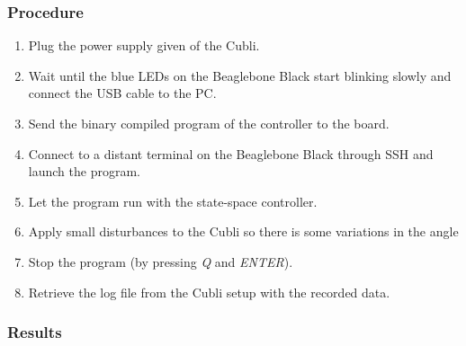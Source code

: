 \subsubsection{Procedure}
\begin{enumerate}
	  \item Plug the power supply given of the Cubli.
	  \item Wait until the blue LEDs on the Beaglebone Black start blinking slowly and connect the USB cable to the PC.
	  \item Send the binary compiled program of the controller to the board.
	  \item Connect to a distant terminal on the Beaglebone Black through SSH and launch the program.
	  \item Let the program run with the state-space controller.
	  \item Apply small disturbances to the Cubli so there is some variations in the angle
	  \item Stop the program (by pressing \textit{Q} and \textit{ENTER}).
	  \item Retrieve the log file from the Cubli setup with the recorded data.
\end{enumerate}

\subsubsection{Results}

